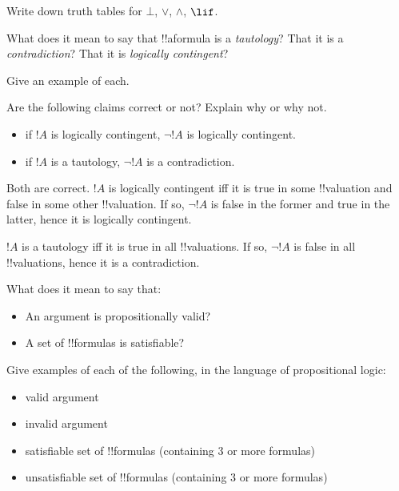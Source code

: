\documentclass[../../../include/open-logic-section]{subfiles}
\begin{document}


\begin{prob}
    Write down truth tables for $\bot$, $\lor$, $\land$, $\lif$.
\end{prob}

\begin{prob}
    What does it mean to say that !!a{formula} is a \emph{tautology}?
    That it is a \emph{contradiction}? That it is \emph{logically contingent}?

    Give an example of each.
\end{prob}

\begin{prob}
    Are the following claims correct or not? Explain why or why not.
    \begin{itemize}
    \item if $!A$ is logically contingent, $\lnot !A$ is logically contingent.
    \item if $!A$ is a tautology, $\lnot !A$ is a contradiction.
    \end{itemize}

    \begin{answer}
    Both are correct. $!A$ is logically contingent iff it is true in some
    !!{valuation} and false in some other !!{valuation}. If so, $\lnot!A$ is
    false in the former and true in the latter, hence it is logically
    contingent.

    $!A$ is a tautology iff it is true in all !!{valuation}s. If so, 
    $\lnot !A$ is false in all !!{valuation}s, hence it is a contradiction.
    \end{answer}
\end{prob}

\begin{prob}
    What does it mean to say that:
    \begin{itemize}
    \item An argument is propositionally valid?
    \item A set of !!{formula}s is satisfiable?
    \end{itemize}

    Give examples of each of the following, in the language of
    propositional logic:
    \begin{itemize}
    \item valid argument
    \item invalid argument
    \item satisfiable set of !!{formula}s (containing 3 or more
    formulas)
    \item unsatisfiable set of !!{formula}s (containing 3 or more
    formulas)
    \end{itemize}
\end{prob}
\end{document}
